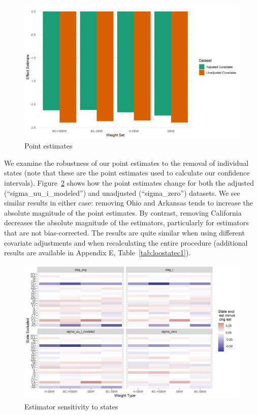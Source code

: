 \documentclass[aoas]{imsart}
\theoremstyle{plain}
\theoremstyle{remark}
\begin{document}
\begin{figure}
\begin{center}
    \caption{Point estimates}
    \label{fig:estimators}
    \includegraphics[scale=0.6]{01_Plots/point-estimates-c1.png}
\end{center}
\end{figure}

We examine the robustness of our point estimates to the removal of individual states (note that these are the point estimates used to calculate our confidence intervals). Figure~\ref{fig:loostateplot} shows how the point estimates change for both the adjusted (``sigma\_uu\_i\_modeled'') and unadjusted (``sigma\_zero'') datasets. We see similar results in either case: removing Ohio and Arkansas tends to increase the absolute magnitude of the point estimates. By contrast, removing California decreases the absolute magnitude of the estimators, particularly for estimators that are not bias-corrected. The results are quite similar when using different covariate adjustments and when recalculating the entire procedure (additional results are available in Appendix E, Table~\ref{tab:loostatec1}). 

\begin{figure}
\begin{center}
    \caption{Estimator sensitivity to states}
    \label{fig:loostateplot}
    \includegraphics[scale=0.6]{01_Plots/loostate-sensitivityc1-state-uu-i.png}
\end{center}
\end{figure}
\end{document}
